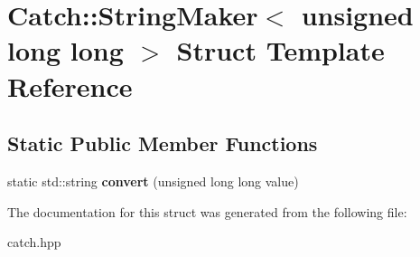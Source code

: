 \hypertarget{structCatch_1_1StringMaker_3_01unsigned_01long_01long_01_4}{}\section{Catch\+::String\+Maker$<$ unsigned long long $>$ Struct Template Reference}
\label{structCatch_1_1StringMaker_3_01unsigned_01long_01long_01_4}
\subsection*{Static Public Member Functions}
\begin{DoxyCompactItemize}
\item 
\mbox{\label{structCatch_1_1StringMaker_3_01unsigned_01long_01long_01_4_a6a8708af4fc8df3f52d7eab779b6bc6f}} 
static std\+::string {\bfseries convert} (unsigned long long value)
\end{DoxyCompactItemize}


The documentation for this struct was generated from the following file\+:\begin{DoxyCompactItemize}
\item 
catch.\+hpp\end{DoxyCompactItemize}
